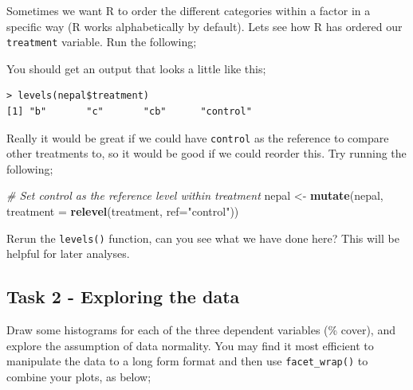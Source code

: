 \documentclass[
]{book}
\newenvironment{Shaded}{\begin{snugshade}}{\end{snugshade}}
\newcommand{\AttributeTok}[1]{\textcolor[rgb]{0.13,0.29,0.53}{#1}}
\newcommand{\CommentTok}[1]{\textcolor[rgb]{0.56,0.35,0.01}{\textit{#1}}}
\newcommand{\FunctionTok}[1]{\textcolor[rgb]{0.13,0.29,0.53}{\textbf{#1}}}
\newcommand{\NormalTok}[1]{#1}
\newcommand{\OtherTok}[1]{\textcolor[rgb]{0.56,0.35,0.01}{#1}}
\newcommand{\SpecialCharTok}[1]{\textcolor[rgb]{0.81,0.36,0.00}{\textbf{#1}}}
\newcommand{\StringTok}[1]{\textcolor[rgb]{0.31,0.60,0.02}{#1}}
\begin{document}
Sometimes we want R to order the different categories within a factor in a specific way (R works alphabetically by default). Lets see how R has ordered our \texttt{treatment} variable. Run the following;

\begin{Shaded}
\end{Shaded}

You should get an output that looks a little like this;

\begin{verbatim}
> levels(nepal$treatment)
[1] "b"       "c"       "cb"      "control"
\end{verbatim}

Really it would be great if we could have \texttt{control} as the reference to compare other treatments to, so it would be good if we could reorder this. Try running the following;

\begin{Shaded}
\begin{Highlighting}[]
\CommentTok{\# Set control as the reference level within treatment}
\NormalTok{nepal }\OtherTok{\textless{}{-}} \FunctionTok{mutate}\NormalTok{(nepal, }\AttributeTok{treatment =} \FunctionTok{relevel}\NormalTok{(treatment, }\AttributeTok{ref=}\StringTok{"control"}\NormalTok{))}
\end{Highlighting}
\end{Shaded}

Rerun the \texttt{levels()} function, can you see what we have done here? This will be helpful for later analyses.

\hypertarget{task-2---exploring-the-data-1}{%
\subsection{Task 2 - Exploring the data}\label{task-2---exploring-the-data-1}}

Draw some histograms for each of the three dependent variables (\% cover), and explore the assumption of data normality. You may find it most efficient to manipulate the data to a long form format and then use \texttt{facet\_wrap()} to combine your plots, as below;
\end{document}
